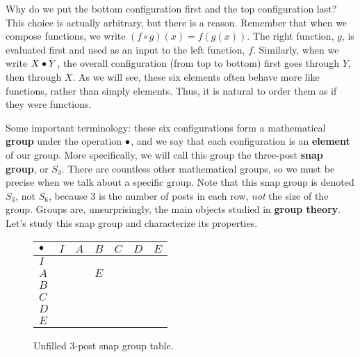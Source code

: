 \documentclass[../gatm.tex]{subfiles}
\begin{document}
Why do we put the bottom configuration first and the top configuration last? This choice is actually arbitrary, but there is a reason. Remember that when we compose functions, we write $(f \circ g)(x)=f(g(x))$. The right function, $g$, is evaluated first and used as an input to the left function, $f$. Similarly, when we write $X\bullet Y$, the overall configuration (from top to bottom) first goes through $Y$, then through $X$. As we will see, these six elements often behave more like functions, rather than simply elements. Thus, it is natural to order them as if they were functions.

Some important terminology: these six configurations form a mathematical \textbf{group} under the operation $\bullet$, and we say that each configuration is an \textbf{element} of our group.
More specifically, we will call this group the three-post \textbf{snap group}, or $S_3$. There are countless other mathematical groups, so we must be precise when we talk about a specific group. Note that this snap group is denoted $S_3$, not $S_6$, because $3$ is the number of posts in each row, \textit{not} the size of the group.
Groups are, unsurprisingly, the main objects studied in \textbf{group theory}.
Let's study this snap group and characterize its properties.


\begin{figure}
	\begin{center}
		\begin{tabular}{C|C|C|C|C|C|C|}
			$\bullet$ & $I$ & $A$ & $B$ & $C$ & $D$ & $E$ \\ \hline
			$I$     &     &     &     &     &     &     \\ \hline
			$A$     &     &     & $E$ &     &     &     \\ \hline
			$B$     &     &     &     &     &     &     \\ \hline
			$C$     &     &     &     &     &     &     \\ \hline
			$D$     &     &     &     &     &     &     \\ \hline
			$E$     &     &     &     &     &     &     \\ \hline
		\end{tabular}
	\end{center}
	\caption{Unfilled $3$-post snap group table.}
	\label{fig:sbstable_CHANG}
\end{figure}
\end{document}
